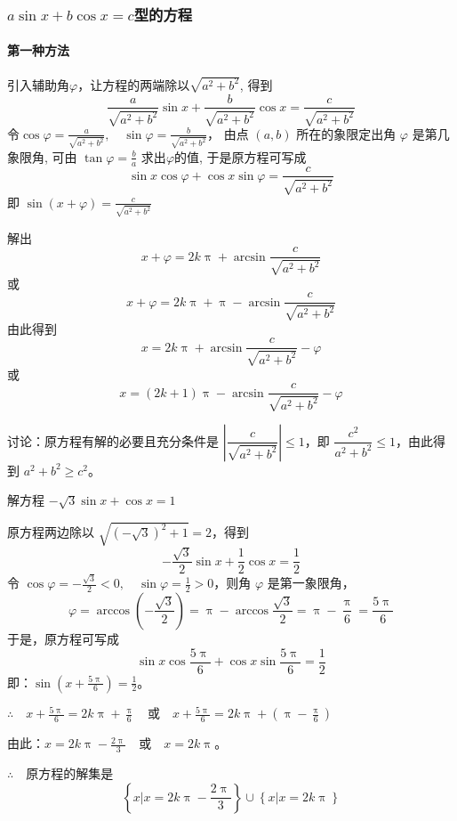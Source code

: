 \subsubsection{$a\sin x +b\cos x=c$型的方程}

\paragraph{第一种方法} 引入辅助角$\varphi$，让方程的两端除以$\sqrt{a^2+b^2}$, 得到
\[\frac{a}{\sqrt{a^{2}+b^{2}}} \sin x+\frac{b}{\sqrt{a^{2}+b^{2}}} \cos x=\frac{c}{\sqrt{a^{2}+b^{2}}}\]
令$\cos \varphi=\frac{a}{\sqrt{a^{2}+b^{2}}}, \quad \sin \varphi=\frac{b}{\sqrt{a^{2}+b^{2}}}$，
由点 $(a, b)$ 所在的象限定出角 $\varphi$ 是第几象限角, 可由 
$\tan \varphi=\frac{b}{a}$ 求出$\varphi$的值, 于是原方程可写成
\[\sin x \cos \varphi+\cos x \sin \varphi=\frac{c}{\sqrt{a^{2}+b^{2}}}\]
即 $\sin (x+\varphi)=\frac{c}{\sqrt{a^{2}+b^{2}}}$

解出 
\begin{equation}
    x+\varphi=2 k \uppi+\arcsin \frac{c}{\sqrt{a^{2}+b^{2}}}
\end{equation}
或
\begin{equation}
    x+\varphi=2 k \uppi+\uppi-\arcsin \frac{c}{\sqrt{a^{2}+b^{2}}}
\end{equation}
由此得到
\[x=2 k \uppi+\arcsin \frac{c}{\sqrt{a^{2}+b^{2}}}-\varphi\]
或
\[x=(2 k+1) \uppi-\arcsin \frac{c}{\sqrt{a^{2}+b^{2}}}-\varphi\]

讨论：原方程有解的必要且充分条件是 $\left| \dfrac{c}{\sqrt{a^{2}+b^{2}}}\right|\leqslant 1$，即 $\dfrac{c^2}{a^2+b^2}\leqslant 1$，由此得到
$a^2+b^2\geqslant c^2$。

\begin{example}
  解方程 $-\sqrt{3}\sin x+\cos x=1$
\end{example}

\begin{solution}
原方程两边除以 $\sqrt{(-\sqrt{3})^2+1}=2$，得到
\[-\frac{\sqrt{3}}{2}\sin x+\frac{1}{2}\cos x=\frac{1}{2}\]
令 $\cos\varphi=-\frac{\sqrt{3}}{2}<0,\quad \sin\varphi=\frac{1}{2}>0$，则角 $\varphi$ 是第一象限角，
\[\varphi=\arccos\left(-\frac{\sqrt{3}}{2}\right)=\uppi-\arccos\frac{\sqrt{3}}{2}=\uppi-\frac{\uppi}{6}=\frac{5\uppi}{6}\]
于是，原方程可写成
\[\sin x\cos\frac{5\uppi}{6}+\cos x\sin \frac{5\uppi}{6}=\frac{1}{2}\]
即：$\sin\left(x+\frac{5\uppi}{6}\right)=\frac{1}{2}$。

$\therefore\quad x+\frac{5\uppi}{6}=2k\uppi+\frac{\uppi}{6}\quad \text{或}\quad x+\frac{5\uppi}{6}=2k\uppi+\left(\uppi-\frac{\uppi}{6}\right)$

由此：$x=2k\uppi-\frac{2\uppi}{3}\quad \text{或}\quad x=2k\uppi$。

$\therefore\quad $原方程的解集是
\[\left\{x\big|x=2k\uppi-\frac{2\uppi}{3}\right\}\cup \left\{x\big|x=2k\uppi\right\}\]
\end{solution}

